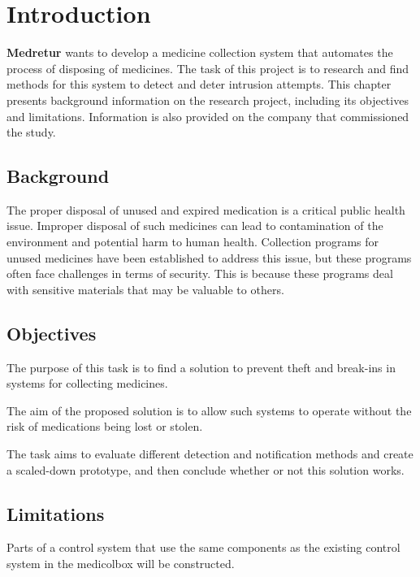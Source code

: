 \documentclass[../main.tex]{subfiles}
\begin{document}
\section{Introduction}

\textbf{Medretur} wants to develop a medicine collection
system that automates the process of disposing of medicines.
The task of this project is to research and find methods for
this system to detect and deter intrusion attempts. This
chapter presents background information on the research
project, including its objectives and limitations. Information
is also provided on the company that commissioned the study.

\subsection{Background}

The proper disposal of unused and expired medication is a
critical public health issue\cite{Throckmorton_2021}. Improper
disposal of such medicines can lead to contamination of the
environment and potential harm to human health\cite{Boxall_2004,
/content/publication/3854026c-en}.
Collection programs for unused medicines have been established to
address this issue\cite{Apotek_1_2023, Commissioner_2021, Helsenorge_2019},
but these programs often face challenges in terms of security\cite{Lutro_2005}.
This is because these programs deal with
sensitive materials that may be valuable to others\cite{Nations_2023}.

\subsection{Objectives}
The purpose of this task is to find a solution to prevent
theft and break-ins in systems for collecting medicines.

The aim of the proposed solution is to allow such systems to
operate without the risk of medications being lost or stolen.

The task aims to evaluate different detection and notification
methods and create a scaled-down prototype,
and then conclude whether or not this solution works.

\subsection{Limitations}
Parts of a control system that use the same components as the
existing control system in the \gls{medicolbox} will be constructed. 
\end{document}
